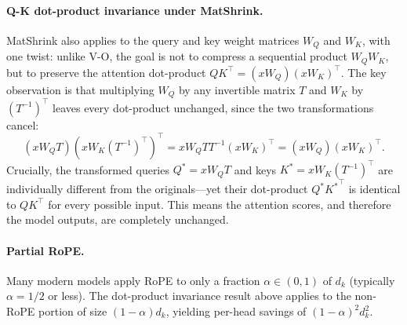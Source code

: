 \documentclass{article}
\begin{document}
\paragraph{Q-K dot-product invariance under MatShrink.}\label{prop:qk}
MatShrink also applies to the query and key weight matrices $W_Q$ and $W_K$, with one twist: unlike V-O, the goal is not to compress a sequential product $W_Q W_K$, but to preserve the attention dot-product $Q K^\top = (x W_Q)(x W_K)^\top$. The key observation is that multiplying $W_Q$ by any invertible matrix $T$ and $W_K$ by $(T^{-1})^\top$ leaves every dot-product unchanged, since the two transformations cancel:
\[
  (x W_Q T) \left(x W_K (T^{-1})^\top \right)^\top = x W_Q T T^{-1} (x W_K)^\top = (x W_Q)(x W_K)^\top.
\]
Crucially, the transformed queries $Q^* = x W_Q T$ and keys $K^* = x W_K (T^{-1})^\top$ are individually different from the originals---yet their dot-product $Q^* {K^*}^\top$ is identical to $Q K^\top$ for every possible input. This means the attention scores, and therefore the model outputs, are completely unchanged.

\paragraph{Partial RoPE.}
Many modern models apply RoPE to only a fraction $\alpha \in (0,1)$ of $d_k$ (typically $\alpha = 1/2$ or less). The dot-product invariance result above applies to the non-RoPE portion of size $(1-\alpha)d_k$, yielding per-head savings of $(1-\alpha)^2 d_k^2$.



\end{document}
